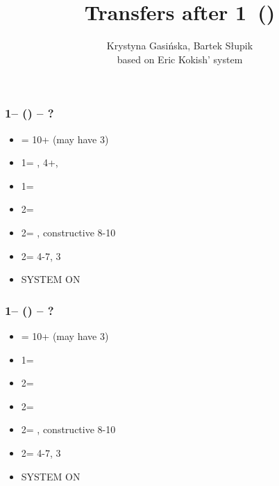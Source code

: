 \documentclass[12pt, a4paper]{article}
\title{Transfers after 1\major\ (\dbl)}
\author{Krystyna Gasińska, Bartek Słupik\\based on Eric Kokish' system}
\begin{document}
\maketitle


\subsubsection*{1\hearts -- (\dbl) -- ?}
\begin{itemize}
    \item \rdbl = 10+ (may have 3\hearts)
    \item 1\spades = \nat, 4+\spades, \fonce
    \item 1\nt = \trsf{2\clubs}
    \item 2\clubs = \trsf{2\diams}
    \item 2\diams = \trsf{2\hearts}, constructive 8-10
    \item 2\hearts = 4-7, 3\hearts
    \item \small{SYSTEM ON}
\end{itemize}

\subsubsection*{1\spades -- (\dbl) -- ?}
\begin{itemize}
    \item \rdbl = 10+ (may have 3\spades)
    \item 1\nt = \trsf{ 2\clubs}
    \item 2\clubs = \trsf{2\diams}
    \item 2\diams = \trsf{2\hearts}
    \item 2\hearts = \trsf{2\spades}, constructive 8-10
    \item 2\spades = 4-7, 3\spades
    \item \small{SYSTEM ON}
\end{itemize}

\end{document}
